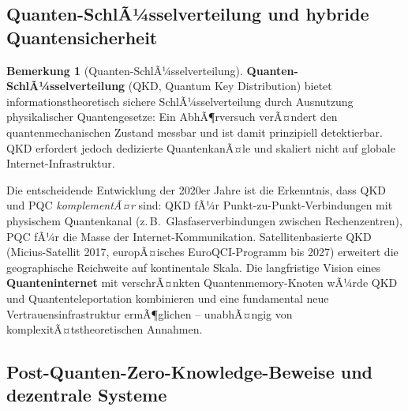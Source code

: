 ﻿\documentclass[a4paper,12pt]{article}
\theoremstyle{definition}
\newtheorem{bemerkung}{Bemerkung}[section]
\begin{document}
\subsection{Quanten-SchlÃ¼sselverteilung und hybride Quantensicherheit}

\begin{bemerkung}[Quanten-SchlÃ¼sselverteilung]
\textbf{Quanten-SchlÃ¼sselverteilung} (QKD, Quantum Key Distribution)
\cite{BB84} bietet informationstheoretisch sichere SchlÃ¼sselverteilung
durch Ausnutzung physikalischer Quantengesetze: Ein AbhÃ¶rversuch
verÃ¤ndert den quantenmechanischen Zustand messbar und ist damit
prinzipiell detektierbar. QKD erfordert jedoch dedizierte
QuantenkanÃ¤le und skaliert nicht auf globale Internet-Infrastruktur.

Die entscheidende Entwicklung der 2020er Jahre ist die Erkenntnis,
dass QKD und PQC \emph{komplementÃ¤r} sind: QKD fÃ¼r
Punkt-zu-Punkt-Verbindungen mit physischem Quantenkanal
(z.\,B.\ Glasfaserverbindungen zwischen Rechenzentren),
PQC fÃ¼r die Masse der Internet-Kommunikation.
Satellitenbasierte QKD (Micius-Satellit 2017, europÃ¤isches
EuroQCI-Programm bis 2027) erweitert die geographische Reichweite
auf kontinentale Skala. Die langfristige Vision eines
\textbf{Quanteninternet} mit verschrÃ¤nkten Quantenmemory-Knoten
wÃ¼rde QKD und Quantenteleportation kombinieren und eine fundamental
neue Vertrauensinfrastruktur ermÃ¶glichen -- unabhÃ¤ngig von
komplexitÃ¤tstheoretischen Annahmen.
\end{bemerkung}

\subsection{Post-Quanten-Zero-Knowledge-Beweise und dezentrale Systeme}
\end{document}
